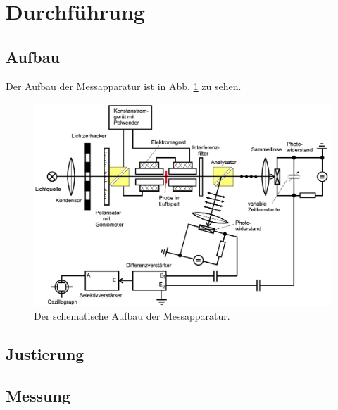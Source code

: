 \section{Durchführung}
\label{sec:Durchführung}

\subsection{Aufbau}
Der Aufbau der Messapparatur ist in Abb. \ref{fig:Aufbau} zu sehen.
\begin{figure}
    \centering
    \includegraphics[width=15cm]{fotos/Aufbau.png}
    \caption{Der schematische Aufbau der Messapparatur. \cite{V46}}
    \label{fig:Aufbau}
\end{figure}

\subsection{Justierung}

\subsection{Messung}